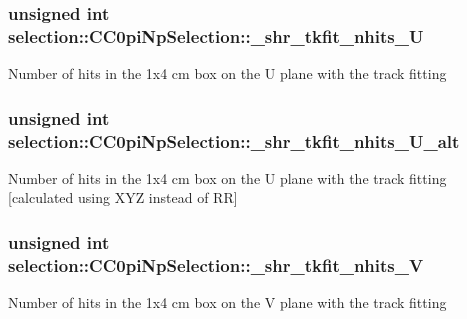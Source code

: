 \subsubsection[{\texorpdfstring{\+\_\+shr\+\_\+tkfit\+\_\+nhits\+\_\+U}{_shr_tkfit_nhits_U}}]{\setlength{\rightskip}{0pt plus 5cm}unsigned int selection\+::\+C\+C0pi\+Np\+Selection\+::\+\_\+shr\+\_\+tkfit\+\_\+nhits\+\_\+U\hspace{0.3cm}{\ttfamily [private]}}\hypertarget{classselection_1_1CC0piNpSelection_a6c75f5783174133ce97849f128f3dee3}{}\label{classselection_1_1CC0piNpSelection_a6c75f5783174133ce97849f128f3dee3}
Number of hits in the 1x4 cm box on the U plane with the track fitting 
\subsubsection[{\texorpdfstring{\+\_\+shr\+\_\+tkfit\+\_\+nhits\+\_\+\+U\+\_\+alt}{_shr_tkfit_nhits_U_alt}}]{\setlength{\rightskip}{0pt plus 5cm}unsigned int selection\+::\+C\+C0pi\+Np\+Selection\+::\+\_\+shr\+\_\+tkfit\+\_\+nhits\+\_\+\+U\+\_\+alt\hspace{0.3cm}{\ttfamily [private]}}\hypertarget{classselection_1_1CC0piNpSelection_a2a432bd36ae5dc824470183ca6621218}{}\label{classselection_1_1CC0piNpSelection_a2a432bd36ae5dc824470183ca6621218}
Number of hits in the 1x4 cm box on the U plane with the track fitting \mbox{[}calculated using X\+YZ instead of RR\mbox{]} 
\subsubsection[{\texorpdfstring{\+\_\+shr\+\_\+tkfit\+\_\+nhits\+\_\+V}{_shr_tkfit_nhits_V}}]{\setlength{\rightskip}{0pt plus 5cm}unsigned int selection\+::\+C\+C0pi\+Np\+Selection\+::\+\_\+shr\+\_\+tkfit\+\_\+nhits\+\_\+V\hspace{0.3cm}{\ttfamily [private]}}\hypertarget{classselection_1_1CC0piNpSelection_adab23c54dd799cdf83c31a10e4ae9061}{}\label{classselection_1_1CC0piNpSelection_adab23c54dd799cdf83c31a10e4ae9061}
Number of hits in the 1x4 cm box on the V plane with the track fitting 
